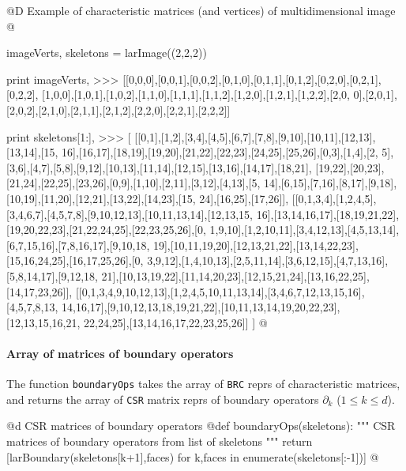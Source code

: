 \documentclass[11pt,oneside]{article}	%
\begin{document}
@D Example of characteristic matrices (and vertices) of multidimensional image
@{imageVerts, skeletons = larImage((2,2,2))

print imageVerts,
>>> [[0,0,0],[0,0,1],[0,0,2],[0,1,0],[0,1,1],[0,1,2],[0,2,0],[0,2,1],[0,2,2],
[1,0,0],[1,0,1],[1,0,2],[1,1,0],[1,1,1],[1,1,2],[1,2,0],[1,2,1],[1,2,2],[2,0,
0],[2,0,1],[2,0,2],[2,1,0],[2,1,1],[2,1,2],[2,2,0],[2,2,1],[2,2,2]]

print skeletons[1:],
>>> [
[[0,1],[1,2],[3,4],[4,5],[6,7],[7,8],[9,10],[10,11],[12,13],[13,14],[15,
16],[16,17],[18,19],[19,20],[21,22],[22,23],[24,25],[25,26],[0,3],[1,4],[2,
5],[3,6],[4,7],[5,8],[9,12],[10,13],[11,14],[12,15],[13,16],[14,17],[18,21],
[19,22],[20,23],[21,24],[22,25],[23,26],[0,9],[1,10],[2,11],[3,12],[4,13],[5,
14],[6,15],[7,16],[8,17],[9,18],[10,19],[11,20],[12,21],[13,22],[14,23],[15,
24],[16,25],[17,26]],
[[0,1,3,4],[1,2,4,5],[3,4,6,7],[4,5,7,8],[9,10,12,13],[10,11,13,14],[12,13,15,
16],[13,14,16,17],[18,19,21,22],[19,20,22,23],[21,22,24,25],[22,23,25,26],[0,
1,9,10],[1,2,10,11],[3,4,12,13],[4,5,13,14],[6,7,15,16],[7,8,16,17],[9,10,18,
19],[10,11,19,20],[12,13,21,22],[13,14,22,23],[15,16,24,25],[16,17,25,26],[0,
3,9,12],[1,4,10,13],[2,5,11,14],[3,6,12,15],[4,7,13,16],[5,8,14,17],[9,12,18,
21],[10,13,19,22],[11,14,20,23],[12,15,21,24],[13,16,22,25],[14,17,23,26]],
[[0,1,3,4,9,10,12,13],[1,2,4,5,10,11,13,14],[3,4,6,7,12,13,15,16],[4,5,7,8,13,
14,16,17],[9,10,12,13,18,19,21,22],[10,11,13,14,19,20,22,23],[12,13,15,16,21,
22,24,25],[13,14,16,17,22,23,25,26]]
]
@}


\paragraph{Array of matrices of boundary operators}

The function \texttt{boundaryOps} takes the array of \texttt{BRC} reprs of characteristic matrices, and returns the array of \texttt{CSR} matrix reprs of boundary operators $\partial_k$ ($1\leq k\leq d$).

@d CSR matrices of boundary operators
@{def boundaryOps(skeletons):
	""" CSR matrices of boundary operators from list of skeletons """
	return [larBoundary(skeletons[k+1],faces) 
		for k,faces in enumerate(skeletons[:-1])]
@}
\end{document}
